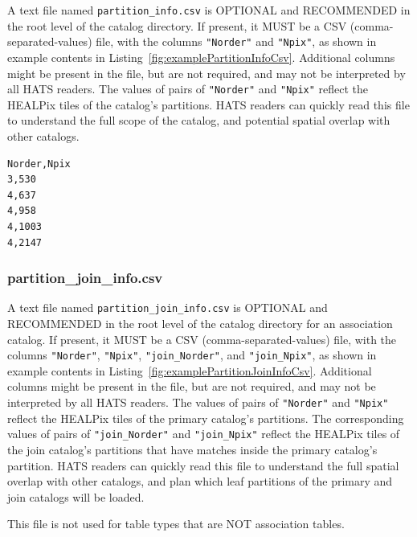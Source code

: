 \documentclass[11pt,a4paper]{ivoa}
\begin{document}
A text file named \texttt{partition\_info.csv} is OPTIONAL and RECOMMENDED in the root level of the catalog directory.
If present, it MUST be a CSV (comma-separated-values) file, with the columns \texttt{"Norder"} and \texttt{"Npix"}, as shown in example contents in Listing~\ref{fig:examplePartitionInfoCsv}.
Additional columns might be present in the file, but are not required, and may not be interpreted by all HATS readers.
The values of pairs of \texttt{"Norder"} and \texttt{"Npix"} reflect the HEALPix tiles of the catalog's partitions. 
HATS readers can quickly read this file to understand the full scope of the catalog, and potential spatial overlap with other catalogs.

\begin{minipage}{\linewidth}
\begin{lstlisting}[caption=Example \texttt{partition\_info.csv} file contents, label=fig:examplePartitionInfoCsv]    
Norder,Npix
3,530
4,637
4,958
4,1003
4,2147
\end{lstlisting}
\end{minipage}

\subsubsection{partition\_join\_info.csv} 

A text file named \texttt{partition\_join\_info.csv} is OPTIONAL and RECOMMENDED in the root level of the catalog directory for an association catalog.
If present, it MUST be a CSV (comma-separated-values) file, with the columns \texttt{"Norder"}, \texttt{"Npix"}, \texttt{"join\_Norder"}, and \texttt{"join\_Npix"}, as shown in example contents in Listing~\ref{fig:examplePartitionJoinInfoCsv}.
Additional columns might be present in the file, but are not required, and may not be interpreted by all HATS readers.
The values of pairs of \texttt{"Norder"} and \texttt{"Npix"} reflect the HEALPix tiles of the primary catalog's partitions. 
The corresponding values of pairs of \texttt{"join\_Norder"} and \texttt{"join\_Npix"} reflect the HEALPix tiles of the join catalog's partitions that have matches inside the primary catalog's partition.
HATS readers can quickly read this file to understand the full spatial overlap with other catalogs, and plan which leaf partitions of the primary and join catalogs will be loaded. \par

This file is not used for table types that are NOT association tables.
\end{document}
